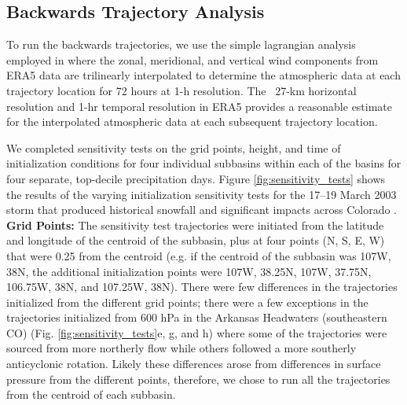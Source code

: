 \documentclass[draft]{agujournal2019}
\begin{document}
\subsection{Backwards Trajectory Analysis}

To run the backwards trajectories, we use the simple lagrangian analysis employed in  where the zonal, meridional, and vertical wind components from ERA5 data are trilinearly interpolated to determine the atmospheric data at each trajectory location for 72 hours at 1-h resolution. The ~27-km horizontal resolution and 1-hr temporal resolution in ERA5 provides a reasonable estimate for the interpolated atmospheric data at each subsequent trajectory location.

We completed sensitivity tests on the grid points, height, and time of initialization conditions for four individual subbasins within each of the basins for four separate, top-decile precipitation days. Figure \ref{fig:sensitivity_tests} shows the results of the varying initialization sensitivity tests for the 17--19 March 2003 storm that produced historical snowfall and significant impacts across Colorado \cite{Wesley2013Extreme2003}. \textbf{Grid Points:} The sensitivity test trajectories were initiated from the latitude and longitude of the centroid of the subbasin, plus at four points (N, S, E, W) that were 0.25\textdegree{} from the centroid (e.g. if the centroid of the subbasin was 107\textdegree W, 38\textdegree N, the additional initialization points were 107\textdegree W, 38.25\textdegree N, 107\textdegree W, 37.75\textdegree N, 106.75\textdegree W, 38\textdegree N, and 107.25\textdegree W, 38\textdegree N). There were few differences in the trajectories initialized from the different grid points; there were a few exceptions in the trajectories initialized from 600 hPa in the Arkansas Headwaters (southeastern CO) (Fig. \ref{fig:sensitivity_tests}e, g, and h) where some of the trajectories were sourced from more northerly flow while others followed a more southerly anticyclonic rotation. Likely these differences arose from differences in surface pressure from the different points, therefore, we chose to run all the trajectories from the centroid of each subbasin.
\end{document}
